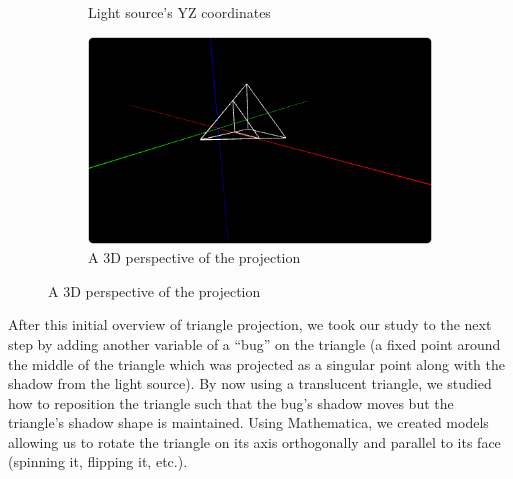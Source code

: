 \documentclass[11pt]{extarticle}
\begin{document}
\begin{figure}[!ht]
\begin{subfigure}{.5\textwidth}
            \caption{Light source's YZ coordinates}
        \end{subfigure}
        \begin{subfigure}{.5\textwidth}
            \centering
            \includegraphics[scale=.5]{p5_4.png}
            \caption{A 3D perspective of the projection}
        \end{subfigure}
    \end{figure}

	After this initial overview of triangle projection, we took our study to the next step by adding another variable of a “bug” on the triangle (a fixed point around the middle of the triangle which was projected as a singular point along with the shadow from the light source). By now using a translucent triangle, we studied how to reposition the triangle such that the bug’s shadow moves but the triangle’s shadow shape is maintained. Using Mathematica, we created models allowing us to rotate the triangle on its axis orthogonally and parallel to its face (spinning it, flipping it, etc.).
\end{document}

